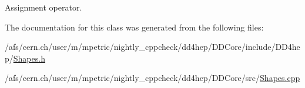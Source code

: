 Assignment operator. 



The documentation for this class was generated from the following files\+:\begin{DoxyCompactItemize}
\item 
/afs/cern.\+ch/user/m/mpetric/nightly\+\_\+cppcheck/dd4hep/\+D\+D\+Core/include/\+D\+D4hep/\hyperlink{_shapes_8h}{Shapes.\+h}\item 
/afs/cern.\+ch/user/m/mpetric/nightly\+\_\+cppcheck/dd4hep/\+D\+D\+Core/src/\hyperlink{_shapes_8cpp}{Shapes.\+cpp}\end{DoxyCompactItemize}
